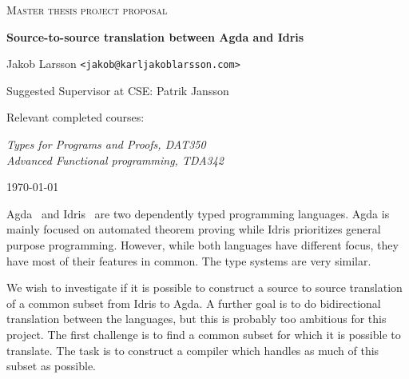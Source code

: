 \documentclass{scrartcl}
\begin{document}
\begin{titlepage}

\centering
{\scshape\LARGE Master thesis project proposal}

\vspace{0.5cm}
{\huge\bfseries Source-to-source translation between Agda and Idris
  }

\vspace{2cm}
{\Large Jakob Larsson \texttt{<jakob@karljakoblarsson.com>}}

\vspace{1.0cm}
{\large Suggested Supervisor at CSE: Patrik Jansson }

\vspace{1.5cm}
{\large Relevant completed courses:}

{\itshape
Types for Programs and Proofs, DAT350 \\
Advanced Functional programming, TDA342 \\
}

\vfill
{\large \today}

\end{titlepage}


Agda~\cite{agda} and Idris~\cite{idris} are two dependently typed programming
languages.  Agda is mainly focused on automated theorem proving while Idris
prioritizes general purpose programming.  However, while both languages have
different focus, they have most of their features in common. The type systems
are very similar.

We wish to investigate if it is possible to construct a source to source
translation of a common subset from Idris to Agda.  A further goal is to do
bidirectional translation between the languages, but this is probably too
ambitious for this project.  The first challenge is to find a common subset for
which it is possible to translate. The task is to construct a compiler which
handles as much of this subset as possible.


\end{document}
